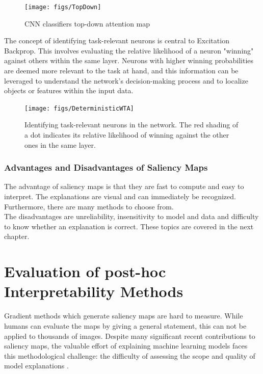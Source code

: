 \begin{figure}[h!]
	\centering
	\texttt{[image: figs/TopDown]}
	\caption[CNN classifiers top-down attention map]{CNN classifiers top-down attention map \cite{zhang2018}}
	\label{fig:topdown}
\end{figure}

The concept of identifying task-relevant neurons is central to Excitation Backprop. This involves evaluating the relative likelihood of a neuron "winning" against others within the same layer. Neurons with higher winning probabilities are deemed more relevant to the task at hand, and this information can be leveraged to understand the network's decision-making process and to localize objects or features within the input data.


\begin{figure}[h!]
	\centering
	\texttt{[image: figs/DeterministicWTA]}
	\caption[Identifying task-relevant neurons in the network.]{Identifying task-relevant neurons in the network. The red shading of a dot indicates its relative likelihood of winning against the other ones in the same layer. \cite{zhang2018}}
	\label{fig:taskrelevant}
\end{figure}

\newpage

\subsection{Advantages and Disadvantages of Saliency Maps \cite{molnar2022}}

The advantage of saliency maps is that they are fast to compute and easy to interpret. The explanations are visual and can immediately be recognized. Furthermore, there are many methods to choose from. 
\\
The disadvantages are unreliability, insensitivity to model and data and difficulty to know whether an explanation is correct. These topics are covered in the next chapter.

\chapter{Evaluation of post-hoc Interpretability Methods}
\label{sec:evaluation}
Gradient methods which generate saliency maps are hard to measure. While humans can evaluate the maps by giving a general statement, this can not be applied to thousands of images. Despite many significant recent contributions to saliency maps, the valuable effort of explaining machine learning models faces this methodological challenge: the difficulty of assessing the scope and quality of model explanations \cite{adebayo2020sanity}.



